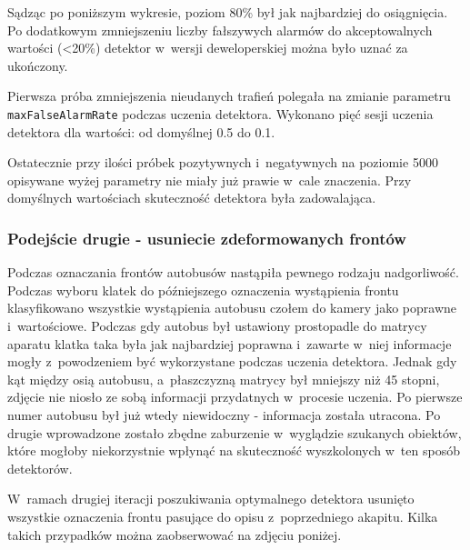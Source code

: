 Sądząc po poniższym wykresie, poziom 80\% był jak najbardziej do
osiągnięcia. Po dodatkowym zmniejszeniu liczby fałszywych alarmów 
do akceptowalnych wartości (<20\%) detektor w~wersji deweloperskiej 
można było uznać za ukończony.

\begin{center}
\end{center}

Pierwsza próba zmniejszenia nieudanych trafień polegała na zmianie 
parametru \verb|maxFalseAlarmRate| podczas uczenia detektora. 
Wykonano pięć
sesji uczenia detektora dla wartości: od domyślnej 0.5 do 0.1.

Ostatecznie przy ilości próbek pozytywnych i~negatywnych 
na poziomie 5000 opisywane wyżej parametry nie miały już prawie w~cale
znaczenia. Przy domyślnych wartościach skuteczność detektora była 
zadowalająca.

\subsubsection{Podejście drugie - usuniecie zdeformowanych frontów}

Podczas oznaczania frontów autobusów nastąpiła pewnego rodzaju
nadgorliwość. Podczas wyboru klatek do późniejszego oznaczenia
wystąpienia frontu klasyfikowano wszystkie wystąpienia autobusu
czołem do kamery jako poprawne i~wartościowe. Podczas gdy autobus
był ustawiony prostopadle do matrycy aparatu klatka taka była
jak najbardziej poprawna i~zawarte w~niej informacje mogły
z~powodzeniem być wykorzystane podczas uczenia detektora. Jednak
gdy kąt między osią autobusu, a~płaszczyzną matrycy był mniejszy
niż 45 stopni, zdjęcie nie niosło ze sobą informacji przydatnych
w~procesie uczenia. Po pierwsze numer autobusu był już wtedy
niewidoczny - informacja została utracona. Po drugie wprowadzone
zostało zbędne zaburzenie w~wyglądzie szukanych obiektów,
które mogłoby niekorzystnie wpłynąć na skuteczność wyszkolonych
w~ten sposób detektorów.

W~ramach drugiej iteracji poszukiwania optymalnego detektora
usunięto wszystkie oznaczenia frontu pasujące do opisu
z~poprzedniego akapitu. Kilka takich przypadków można
zaobserwować na zdjęciu poniżej.

